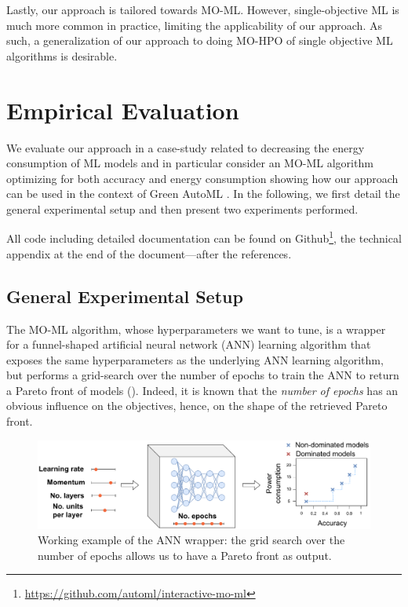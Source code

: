 Lastly, our approach is tailored towards MO-ML. However, single-objective ML is much more common in practice, limiting the applicability of our approach. As such, a generalization of our approach to doing MO-HPO of single objective ML algorithms is desirable.



\section{Empirical Evaluation}
\label{moo-sec:evaluation}

We evaluate our approach in a case-study related to decreasing the energy consumption of ML models and in particular consider an MO-ML algorithm optimizing for both accuracy and energy consumption showing how our approach can be used in the context of Green AutoML \cite{tornede-jair23a}. In the following, we first detail the general experimental setup and then present two experiments performed.

All code including detailed documentation can be found on Github\footnote{\url{https://github.com/automl/interactive-mo-ml}}, the technical appendix at the end of the document---after the references.

\subsection{General Experimental Setup}
\label{moo-ssec:experimental_setup}

The MO-ML algorithm, whose hyperparameters we want to tune, is a wrapper for a funnel-shaped artificial neural network (ANN) learning algorithm that exposes the same hyperparameters as the underlying ANN learning algorithm, but performs a grid-search over the number of epochs to train the ANN to return a Pareto front of models ().
Indeed, it is known that the \textit{number of epochs} has an obvious influence on the objectives, hence, on the shape of the retrieved Pareto front.

\begin{figure}[h]
    \centering
    \includegraphics[width=0.8\columnwidth]{chapters/human-centric/moo/img/grid_search.pdf}
    \caption{Working example of the ANN wrapper: the grid search over the number of epochs allows us to have a Pareto front as output.}
    \label{moo-fig:grid_search}
\end{figure}

